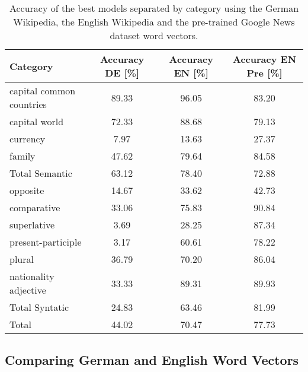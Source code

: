\begin{table}[!hptb]
\centering
\small
\caption{Accuracy of the best models separated by category using the German
  Wikipedia, the English Wikipedia and the pre-trained Google News dataset
  word vectors. } 
\label{tab:language_comparisson}


\small
\begin{tabular}{|l|c|c|c|}
\hline
 Category                  &  Accuracy DE [\%]  &  Accuracy EN [\%]  &
 Accuracy EN Pre [\%]  \\
\hline
 capital common countries  &             89.33  &             96.05  &              83.20  \\
 capital world             &             72.33  &             88.68  &              79.13  \\
 currency                  &              7.97  &             13.63  &              27.37  \\
 family                    &             47.62  &             79.64  &              84.58  \\
\hline
 Total Semantic            &             63.12  &             78.40  &              72.88  \\
\hline
 opposite                  &             14.67  &             33.62  &              42.73  \\
 comparative               &             33.06  &             75.83  &              90.84  \\
 superlative               &              3.69  &             28.25  &              87.34  \\
 present-participle        &              3.17  &             60.61  &              78.22  \\
 plural                    &             36.79  &             70.20  &              86.04  \\
 nationality adjective     &             33.33  &             89.31  &              89.93  \\
\hline
 Total Syntatic            &             24.83  &             63.46  &              81.99  \\
\hline
 Total                     &             44.02  &             70.47  &              77.73  \\
\hline
\end{tabular}

\end{table}





\subsection{Comparing German and English Word Vectors}
\label{sec:sub:comparing_english_german_w2v}

